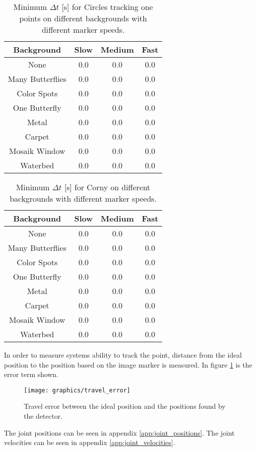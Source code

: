 \begin{table}[H]
\center
\begin{tabular}{|c|c|c|c|}
\hline
Background & Slow & Medium & Fast \\ \hline
None & 0.0 & 0.0 & 0.0 \\ \hline
Many Butterflies & 0.0 & 0.0 & 0.0 \\ \hline
Color Spots & 0.0 & 0.0 & 0.0 \\ \hline
One Butterfly & 0.0 & 0.0 & 0.0 \\ \hline
Metal & 0.0 & 0.0 & 0.0 \\ \hline
Carpet & 0.0 & 0.0 & 0.0 \\ \hline
Mosaik Window & 0.0 & 0.0 & 0.0 \\ \hline
Waterbed & 0.0 & 0.0 & 0.0 \\ \hline
\end{tabular}
\caption{Minimum $\Delta t$ [s] for Circles tracking one points on different backgrounds with different marker speeds.}
\label{tb:min_dt_circles_center}
\end{table}

\begin{table}[H]
\center
\begin{tabular}{|c|c|c|c|}
\hline
Background & Slow & Medium & Fast \\ \hline
None & 0.0 & 0.0 & 0.0 \\ \hline
Many Butterflies & 0.0 & 0.0 & 0.0 \\ \hline
Color Spots & 0.0 & 0.0 & 0.0 \\ \hline
One Butterfly & 0.0 & 0.0 & 0.0 \\ \hline
Metal & 0.0 & 0.0 & 0.0 \\ \hline
Carpet & 0.0 & 0.0 & 0.0 \\ \hline
Mosaik Window & 0.0 & 0.0 & 0.0 \\ \hline
Waterbed & 0.0 & 0.0 & 0.0 \\ \hline
\end{tabular}
\caption{Minimum $\Delta t$ [s] for Corny on different backgrounds with different marker speeds.}
\label{tb:min_dt_corny}
\end{table}

In order to measure systems ability to track the point, distance from the ideal position to the position based on the image marker is measured.
In figure \ref{fig:travel_error} is the error term shown.

\begin{figure}
 \centering
 \texttt{[image: graphics/travel\_error]} %
 \caption{Travel error between the ideal position and the positions found by the detector.}
 \label{fig:travel_error}
\end{figure}

The joint positions can be seen in appendix \ref{app:joint_positions}.
The joint velocities can be seen in appendix \ref{app:joint_velocities}.